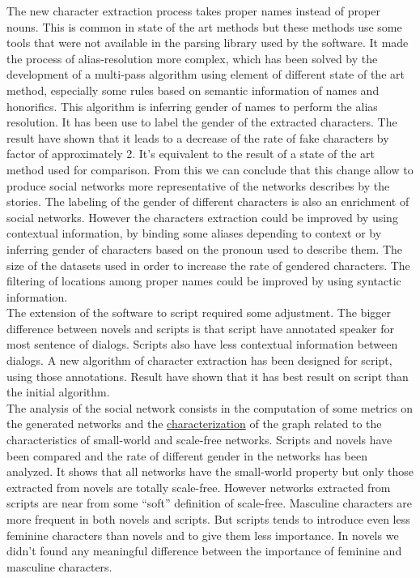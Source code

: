 \documentclass[a4paper, 12pt]{report}
\begin{document}
The new character extraction process takes proper names instead of proper nouns. This is common in state of the art methods but these methods use some tools that were not available in the parsing library used by the software. It made the process of alias-resolution more complex, which has been solved by the development of a multi-pass algorithm using element of different state of the art method, especially some rules based on semantic information of names and honorifics. This algorithm is inferring gender of names to perform the alias resolution. It has been use to label the gender of the extracted characters.
The result have shown that it leads to a decrease of the rate of fake characters by factor of approximately 2.
It's equivalent to the result of a state of the art method used for comparison.
From this we can conclude that this change allow to produce social networks more representative of the networks describes by the stories. 
The labeling of the gender of different characters is also an enrichment of social networks.
However the characters extraction could be improved by using contextual information, 
by binding some aliases depending to context or by inferring gender of characters based on the pronoun used to describe them. 
The size of the datasets used in order to increase the rate of gendered characters. The filtering of locations among proper names could be improved by using syntactic information.\\
 
 The extension of the software to script required some adjustment. The bigger difference between novels and scripts is that  script have annotated speaker for most sentence of dialogs. Scripts also have less contextual information between dialogs.
 A new algorithm of character extraction has been designed for script, using those annotations. Result have shown that it has best result on script than the initial algorithm. \\
 
The analysis of the social network consists in the computation of some metrics on the generated networks and the \hyperref[char]{characterization} of the graph related to the characteristics of small-world and scale-free networks. Scripts and novels have been compared and the rate of different gender in the networks has been analyzed. It shows that all networks have the small-world property but only those extracted from novels are totally scale-free. However networks extracted from scripts are near from some ``soft'' definition of scale-free. Masculine characters are more frequent in both novels and scripts. But scripts tends to introduce even less feminine characters than novels and to give them less importance. In novels we didn't found any meaningful difference between the importance of feminine and masculine characters.
\end{document}
